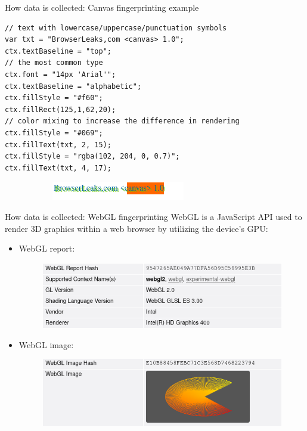 \begin{frame}[fragile]{How data is collected: Canvas fingerprinting example}
  \begin{verbatim}
// text with lowercase/uppercase/punctuation symbols
var txt = "BrowserLeaks,com <canvas> 1.0";
ctx.textBaseline = "top";
// the most common type
ctx.font = "14px 'Arial'";
ctx.textBaseline = "alphabetic";
ctx.fillStyle = "#f60";
ctx.fillRect(125,1,62,20);
// color mixing to increase the difference in rendering
ctx.fillStyle = "#069";
ctx.fillText(txt, 2, 15);
ctx.fillStyle = "rgba(102, 204, 0, 0.7)";
ctx.fillText(txt, 4, 17);
  \end{verbatim}

  \begin{figure}
    \centering
    \begin{subfigure}{0.45\textwidth}
      \includegraphics[width=\linewidth]{images/canvas.png}
    \end{subfigure}
    \begin{subfigure}{0.45\textwidth}
    \end{subfigure}
  \end{figure}
\end{frame}

\begin{frame}{How data is collected: WebGL fingerprinting}
  WebGL is a JavaScript API used to render 3D graphics within a web browser by utilizing the device's GPU:
  \begin{itemize}
    \item WebGL report:
          \begin{figure}
            \centering
            \includegraphics[width=\linewidth, scale=0.9]{images/webgl-report.png}
          \end{figure}
    \item WebGL image:
          \begin{figure}
            \centering
            \includegraphics[width=\linewidth, scale=0.9]{images/webgl-image.png}
          \end{figure}
  \end{itemize}
\end{frame}

